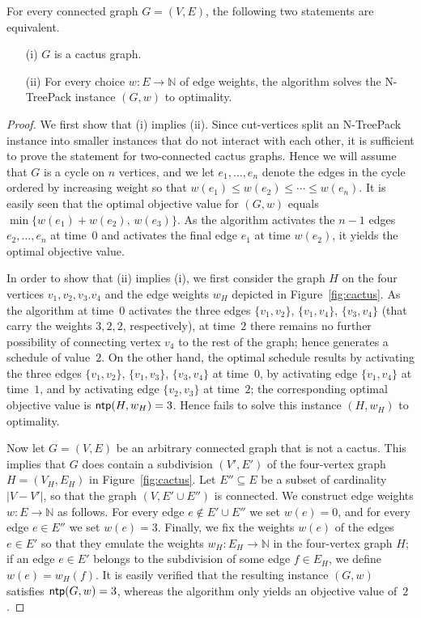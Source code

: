 \documentclass[runningheads]{llncs}
\newcommand{\N}{\mathbb{N}}
\DeclareMathOperator{\ntp}{\text{\sf ntp}}
\newcommand{\xxxNTP}{{\sc N-TreePack}}
\newcommand{\greedy}{\text{\sf Greedy}}
\begin{document}
\begin{theorem}
\label{th:greedy.cactus}
For every connected graph $G=(V,E)$, the following two statements are equivalent.
\begin{itemize}
\item[(i)]  $G$ is a cactus graph.
\item[(ii)] For every choice $w:E\to\N$ of edge weights, the {\greedy} algorithm 
solves the {\xxxNTP} instance $(G,w)$ to optimality.
\end{itemize}
\end{theorem}
\begin{proof}
We first show that (i) implies (ii).
Since cut-vertices split an {\xxxNTP} instance into smaller instances that do not interact 
with each other, it is sufficient to prove the statement for two-connected cactus graphs.
Hence we will assume that $G$ is a cycle on $n$ vertices, and we let $e_1,\ldots,e_n$ 
denote the edges in the cycle ordered by increasing weight so that 
$w(e_1)\le w(e_2)\le\cdots\le w(e_n)$.
It is easily seen that the optimal objective value for $(G,w)$ equals 
$\min\{w(e_1)+w(e_2),\,w(e_3)\}$.
As the {\greedy} algorithm activates the $n-1$ edges $e_2,\ldots,e_n$ at time~$0$ and 
activates the final edge $e_1$ at time $w(e_2)$, it yields the optimal objective value.

In order to show that (ii) implies (i), we first consider the graph $H$ on the four
vertices $v_1,v_2,v_3.v_4$ and the edge weights $w_H$ depicted in Figure~\ref{fig:cactus}.
As the {\greedy} algorithm at time~$0$ activates the three edges $\{v_1,v_2\}$, $\{v_1,v_4\}$, 
$\{v_3,v_4\}$ (that carry the weights $3,2,2$, respectively), at time~$2$ there remains no 
further possibility of connecting vertex $v_4$ to the rest of the graph; hence {\greedy} 
generates a schedule of value~$2$.
On the other hand, the optimal schedule results by activating the three edges $\{v_1,v_2\}$, 
$\{v_1,v_3\}$, $\{v_3,v_4\}$ at time~$0$, by activating edge $\{v_1,v_4\}$ at time~$1$,
and by activating edge $\{v_2,v_3\}$ at time~$2$; the corresponding optimal objective
value is $\ntp(H,w_H)=3$.
Hence {\greedy} fails to solve this instance $(H,w_H)$ to optimality.

Now let $G=(V,E)$ be an arbitrary connected graph that is not a cactus. 
This implies that $G$ does contain a subdivision $(V',E')$ of the four-vertex 
graph $H=(V_H,E_H)$ in Figure~\ref{fig:cactus}.
Let $E''\subseteq E$ be a subset of cardinality $|V-V'|$, so that the graph $(V,E'\cup E'')$
is connected.
We construct edge weights $w:E\to\N$ as follows.
For every edge $e\notin E'\cup E''$ we set $w(e)=0$, and
for every edge $e\in E''$ we set $w(e)=3$.
Finally, we fix the weights $w(e)$ of the edges $e\in E'$ so that they emulate the 
weights $w_H:E_H\to\N$ in the four-vertex graph $H$; if an edge $e\in E'$ belongs to the 
subdivision of some edge $f\in E_H$, we define $w(e)=w_H(f)$.
It is easily verified that the resulting instance $(G,w)$ satisfies $\ntp(G,w)=3$,
whereas the {\greedy} algorithm only yields an objective value of~$2$.
\end{proof}
\end{document}
